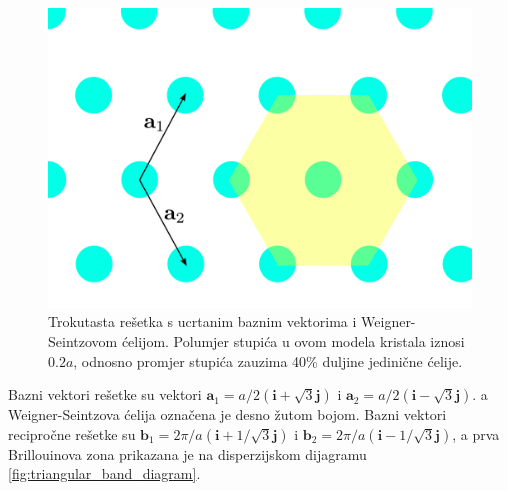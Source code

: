 \documentclass[utf8, seminar]{fer}
\begin{document}
\begin{figure}[ht]
	\centering
	\includegraphics[width = 1.0\linewidth]{./images/triangular_lattice.pdf}
	\caption{Trokutasta rešetka s ucrtanim baznim vektorima i Weigner-Seintzovom
	ćelijom. Polumjer stupića u ovom modela kristala iznosi ${0.2 a}$, odnosno
	promjer stupića zauzima 40\% duljine jedinične ćelije.}
	\label{fig:triangular_lattice}
\end{figure}

Bazni vektori rešetke su vektori
${\mathbf{a}_1 = a/2 (\mathbf{i} + \sqrt{3} \mathbf{j})}$ i
${\mathbf{a}_2 = a/2 (\mathbf{i} - \sqrt{3} \mathbf{j})}$.
a Weigner-Seintzova ćelija označena je desno žutom bojom.
Bazni vektori recipročne rešetke su
${\mathbf{b}_1 = 2 \pi/a( \mathbf{i} + 1/\sqrt{3} \mathbf{j})}$ i
${\mathbf{b}_2 = 2 \pi/a( \mathbf{i} - 1/\sqrt{3} \mathbf{j})}$,
a prva Brillouinova zona prikazana je na disperzijskom dijagramu
\ref{fig:triangular_band_diagram}.
\end{document}

